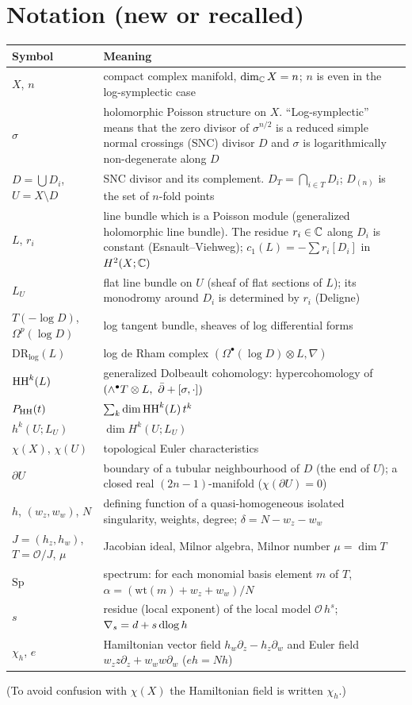 \section{Notation (new or recalled)}\label{sec:notation}
\begin{longtable}{>{\raggedright\arraybackslash}p{3.8cm}>{\raggedright\arraybackslash}p{11.2cm}}
\toprule Symbol & Meaning\\ \midrule\endhead
$X$, $n$ & compact complex manifold, $\dim_\mathbb C X=n$; $n$ is even in the log-symplectic case\\
$\sigma$ & holomorphic Poisson structure on $X$. ``Log-symplectic'' means that the zero divisor of $\sigma^{n/2}$ is a reduced simple normal crossings (SNC) divisor $D$ and $\sigma$ is logarithmically non-degenerate along $D$\\
$D=\bigcup D_i$, $U=X\setminus D$ & SNC divisor and its complement. $D_T=\bigcap_{i\in T}D_i$; $D_{(n)}$ is the set of $n$-fold points\\
$L$, $r_i$ & line bundle which is a Poisson module (generalized holomorphic line bundle). The residue $r_i\in\mathbb C$ along $D_i$ is constant (Esnault--Viehweg); $c_1(L)=-\sum r_i[D_i]$ in $H^2(X;\mathbb C)$\\
$L_U$ & flat line bundle on $U$ (sheaf of flat sections of $L$); its monodromy around $D_i$ is determined by $r_i$ (Deligne)\\
$T(-\log D)$, $\Omega^p(\log D)$ & log tangent bundle, sheaves of log differential forms\\
$\mathrm{DR}_{\log}(L)$ & log de Rham complex $(\Omega^\bullet(\log D)\otimes L,\nabla)$\\
$\mathrm{HH}^k(L)$ & generalized Dolbeault cohomology: hypercohomology of $(\wedge^\bullet T\otimes L,\ \bar\partial+[\sigma,\cdot])$\\
$P_{\mathrm{HH}}(t)$ & $\sum_k\dim\mathrm{HH}^k(L)\,t^k$\\
$h^k(U;L_U)$ & $\dim H^k(U;L_U)$\\
$\chi(X)$, $\chi(U)$ & topological Euler characteristics\\
$\partial U$ & boundary of a tubular neighbourhood of $D$ (the end of $U$); a closed real $(2n-1)$-manifold ($\chi(\partial U)=0$)\\
$h$, $(w_z,w_w)$, $N$ & defining function of a quasi-homogeneous isolated singularity, weights, degree; $\delta=N-w_z-w_w$\\
$J=(h_z,h_w)$, $T=\mathcal O/J$, $\mu$ & Jacobian ideal, Milnor algebra, Milnor number $\mu=\dim T$\\
$\mathrm{Sp}$ & spectrum: for each monomial basis element $m$ of $T$, $\alpha=(\mathrm{wt}(m)+w_z+w_w)/N$\\
$s$ & residue (local exponent) of the local model $\mathcal O\,h^s$; $\nabla_s=d+s\,\mathrm{dlog}\, h$\\
$\chi_h$, $e$ & Hamiltonian vector field $h_w\partial_z-h_z\partial_w$ and Euler field $w_zz\partial_z+w_ww\partial_w$ ($e h=Nh$)\\
\bottomrule
\end{longtable}
(To avoid confusion with $\chi(X)$ the Hamiltonian field is written $\chi_h$.)

